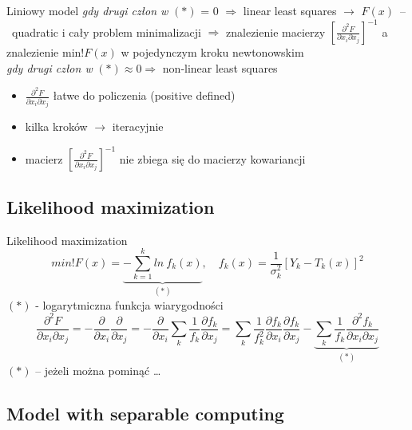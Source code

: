   \begin{frame}{Liniowy model}
    \emph{gdy drugi człon w} $(*)$ = 0 $\Rightarrow$
    linear least squares $\to$ $F(x)$~--~quadratic
    i cały problem minimalizacji $\Rightarrow$ znalezienie
    macierzy $\left[ \frac{\partial^2 F}{\partial x_{i} \partial x_{j}} \right]^{-1}$
    a znalezienie min!$F(x)$ w pojedynczym kroku newtonowskim\\
    \emph{gdy drugi człon w} $(*) \approx 0 \Rightarrow$
    non-linear least squares\\
    \begin{itemize}
      \item $\frac{\partial^2 F}{\partial x_{i} \partial x_{j}}$
      łatwe do policzenia (positive defined) %
      \item kilka kroków $\to$ iteracyjnie
      \item macierz $\left[ \frac{\partial^2 F}{\partial x_{i} \partial x_{j}} \right]^{-1}$
      nie zbiega się do macierzy kowariancji
    \end{itemize}
  \end{frame}

\subsection{Likelihood maximization}
  \begin{frame}{Likelihood maximization}
    \begin{equation}
      min!F(x) = \underbrace{- \sum_{k=1}^{k} ln\ f_{k}(x)}_{(*)}{,} \quad
      f_{k}(x) = \frac{1}{\sigma^{2}_{k}} \left[ Y_{k} - T_{k}(x) \right]^2
      \nonumber
    \end{equation}
    $(*)$ - logarytmiczna funkcja wiarygodności
    \begin{equation}
      \frac{\partial^2 F}{\partial x_{i} \partial x_{j}} =
      - \frac{\partial}{\partial x_{i}}\frac{\partial}{\partial x_{j}} =
      - \frac{\partial}{\partial x_{i}}
      \sum_{k} \frac{1}{f_{k}} \frac{\partial f_{k}}{\partial x_{j}} =
      \sum_{k} \frac{1}{f^{2}_{k}} \frac{\partial f_{k}}{\partial x_{i}} \frac{\partial f_{k}}{\partial x_{j}} -
      \underbrace{\sum_{k} \frac{1}{f_{k}} \frac{\partial^{2} f_{k}}{\partial x_{i} \partial x_{j}}}_{(*)}
      \nonumber
    \end{equation}
    $(*)$ -- jeżeli można pominąć \dots
  \end{frame}

\subsection{Model with separable computing}

